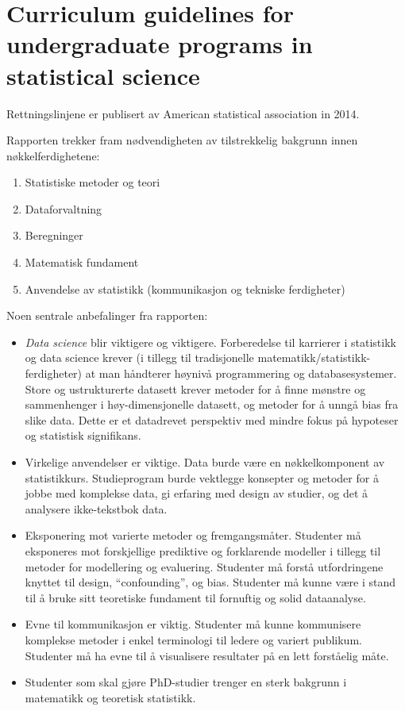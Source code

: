 \section{Curriculum guidelines for undergraduate programs in statistical science}

Rettningslinjene er publisert av American statistical association in 2014\cite{asa-guidelines2014}. 

Rapporten trekker fram nødvendigheten av tilstrekkelig bakgrunn innen nøkkelferdighetene:

\begin{enumerate}
	\item Statistiske metoder og teori
	\item Dataforvaltning
	\item Beregninger
	\item Matematisk fundament
	\item Anvendelse av statistikk (kommunikasjon og tekniske ferdigheter)
\end{enumerate}

Noen sentrale anbefalinger fra rapporten:

\begin{itemize}
	\item \emph{Data science} blir viktigere og viktigere. Forberedelse til karrierer i statistikk og data science krever (i tillegg til tradisjonelle matematikk/statistikk-ferdigheter) at man håndterer høynivå programmering og databasesystemer. Store og ustrukturerte datasett krever metoder for å finne mønstre og sammenhenger i høy-dimensjonelle datasett, og metoder for å unngå bias fra slike data. Dette er et datadrevet perspektiv med mindre fokus på hypoteser og statistisk signifikans.
	\item Virkelige anvendelser er viktige. Data burde være en nøkkelkomponent av statistikkurs. Studieprogram burde vektlegge konsepter og metoder for å jobbe med komplekse data, gi erfaring med design av studier, og det å analysere ikke-tekstbok data.
	\item Eksponering mot varierte metoder og fremgangsmåter. Studenter må eksponeres mot forskjellige prediktive og forklarende modeller i tillegg til metoder for modellering og evaluering. Studenter må forstå utfordringene knyttet til design, \enquote{confounding}, og bias. Studenter må kunne være i stand til å bruke sitt teoretiske fundament til fornuftig og solid dataanalyse.
	\item Evne til kommunikasjon er viktig. Studenter må kunne kommunisere komplekse metoder i enkel terminologi til ledere og variert publikum. Studenter må ha evne til å visualisere resultater på en lett forståelig måte.
	\item Studenter som skal gjøre PhD-studier trenger en sterk bakgrunn i matematikk og teoretisk statistikk.
\end{itemize}


